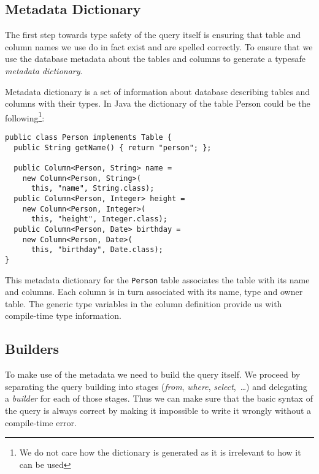 \documentclass{sig-alternate}
\begin{document}
\subsection{Metadata Dictionary}

The first step towards type safety of the query itself is ensuring that table and column names we use do in fact exist and are spelled correctly. To ensure that we use the database metadata about the tables and columns to generate a typesafe \emph{metadata dictionary}.

Metadata dictionary is a set of information about database describing tables and columns with their types. In Java the dictionary of the table Person could be the following\footnote{We do not care how the dictionary is generated as it is irrelevant to how it can be used}:

\begin{verbatim}
public class Person implements Table {
  public String getName() { return "person"; };

  public Column<Person, String> name = 
    new Column<Person, String>(
      this, "name", String.class);
  public Column<Person, Integer> height = 
    new Column<Person, Integer>(
      this, "height", Integer.class);
  public Column<Person, Date> birthday = 
    new Column<Person, Date>(
      this, "birthday", Date.class);
}
\end{verbatim}

This metadata dictionary for the \verb!Person! table associates the table with
its name and columns. Each column is in turn associated with its name, type and
owner table. The generic type variables in the column definition provide us
with compile-time type information.

\subsection{Builders}

To make use of the metadata we need to build the query itself. We proceed by separating the query building into stages (\emph{from}, \emph{where}, \emph{select},~\ldots) and delegating a \emph{builder} for each of those stages. Thus we can make sure that the basic syntax of the query is always correct by making it impossible to write it wrongly without a compile-time error.
\end{document}

